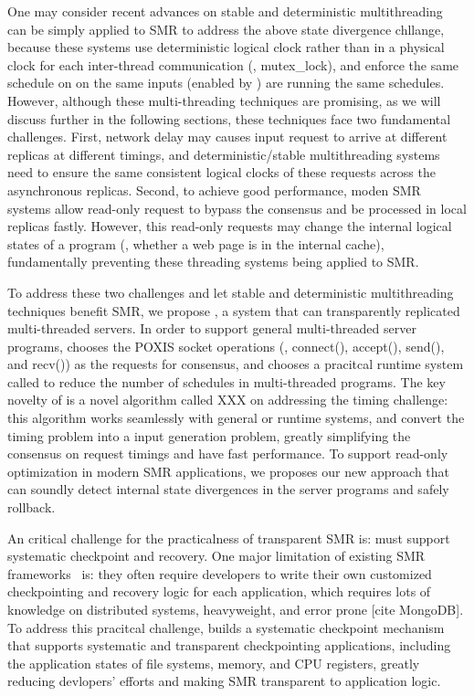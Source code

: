 One may consider recent
advances on stable and deterministic multithreading 
~\cite{dmp:asplos09, coredet:asplos10, dos:osdi10, kendo:asplos09, 
determinator:osdi10, cui:tern:osdi10, dthreads:sosp11, peregrine:sosp11, parrot:sosp13}
can be simply applied to SMR to address the above state divergence chllange,
because these systems use deterministic logical clock rather than in 
 a physical clock for each inter-thread communication (\eg, mutex\_lock), 
 and enforce the same schedule on on the same inputs (enabled by 
\smt) are running the same schedules.
However, although these multi-threading techniques are promising,
as we will discuss further in the following sections, 
these techniques face two fundamental challenges. First, network delay may 
causes input request to arrive at different replicas at different timings,
and deterministic/stable multithreading systems need to 
ensure the same consistent logical clocks of these requests across the asynchronous replicas. Second, 
to achieve good performance, moden SMR systems allow read-only request to 
bypass the consensus and be processed in local replicas fastly. However, this read-only 
requests may change the internal logical states of a program (\eg, whether a 
web page is in the \apache internal cache), 
fundamentally preventing these threading systems being applied to SMR.

To address these two challenges and let stable and deterministic 
multithreading techniques benefit SMR, we propose \msmr, a system that can 
transparently replicated multi-threaded servers.
In order to support general multi-threaded server programs, \msmr chooses the 
POXIS socket operations (\eg, connect(), accept(), send(), and recv()) as the 
requests for consensus, and chooses a pracitcal \smt runtime system called 
\parrot to reduce the number of schedules in multi-threaded programs. The key 
novelty of \msmr is a novel algorithm called XXX on addressing the timing 
challenge: this algorithm works seamlessly with general \smt or \dmt runtime systems, 
and convert the timing problem into a input generation problem, greatly simplifying the consensus on 
request timings and have fast performance. To support read-only optimization 
in modern SMR applications, we proposes our new approach that can soundly 
detect internal state divergences in the server programs and safely rollback.

An critical challenge for the practicalness of transparent SMR is: \msmr must 
support systematic checkpoint and recovery. One major limitation of existing SMR 
frameworks~\cite{rex:eurosys14} is: they often require developers to write their own 
customized checkpointing and recovery logic for each application, which 
requires lots of knowledge on distributed systems, heavyweight, and error prone [cite MongoDB].
To address this pracitcal challenge, \msmr builds a 
systematic checkpoint mechanism that supports systematic and transparent 
checkpointing applications, including the application states of file systems, memory, and CPU 
registers, greatly reducing devlopers' efforts and making SMR transparent to 
application logic.

